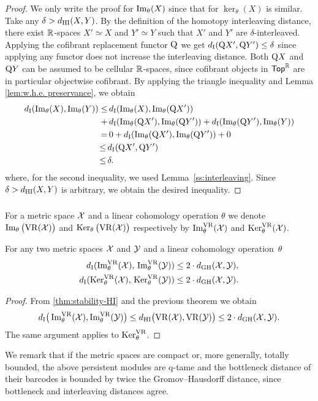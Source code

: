 \begin{proof}
	We only write the proof for $\operatorname{Im}_\theta(X)$ since that for $\ker_\theta(X)$ is similar.
	Take any $\delta > d_{\mathrm{HI}}(X,Y)$.
	By the definition of the homotopy interleaving distance, there exist $\mathbb{R}$-spaces $X' \simeq X$ and $Y' \simeq Y$ such that $X'$ and $Y'$ are $\delta$-interleaved.
	Applying the cofibrant replacement functor $\mathrm{Q}$ we get $d_{\mathrm{I}}(\mathrm{Q} X', \mathrm{Q} Y') \leq \delta$ since applying any functor does not increase the interleaving distance.
	Both $\mathrm{Q} X$ and $\mathrm{Q} Y$ can be assumed to be cellular $\mathbb{R}$-spaces, since cofibrant objects in $\mathsf{Top}^{\mathbb{R}}$ are in particular objectwise cofibrant.
	By applying the triangle inequality and Lemma \ref{lem:w.h.e. preservance}, we obtain
	\begin{align*}
		d_{\mathrm{I}}(\operatorname{Im}_\theta(X), \operatorname{Im}_\theta(Y)) \leq& \,
		d_{\mathrm{I}}(\operatorname{Im}_\theta(X), \operatorname{Im}_\theta(\mathrm{Q} X')) \\ +& \,
		d_{\mathrm{I}}(\operatorname{Im}_\theta(\mathrm{Q} X'), \operatorname{Im}_\theta(\mathrm{Q} Y')) + d_{\mathrm{I}}(\operatorname{Im}_\theta(\mathrm{Q} Y'), \operatorname{Im}_\theta(Y)) \\ =& \,
		0 + d_{\mathrm{I}}(\operatorname{Im}_\theta(\mathrm{Q} X'), \operatorname{Im}_\theta(\mathrm{Q} Y')) + 0 \\ \leq \,&
		d_{\mathrm{I}}(\mathrm{Q} X', \mathrm{Q} Y') \\ \leq \,&
		\delta.
	\end{align*}
	where, for the second inequality, we used Lemma~\ref{ss:interleaving}.
	Since $\delta > d_{\mathrm{HI}}(X,Y)$ is arbitrary, we obtain the desired inequality.
\end{proof}

\subsubsection{}\label{cor:theta stability VR}

For a metric space \(\mathcal{X}\) and a linear cohomology operation \(\theta\) we denote \(\operatorname{Im}_\theta\big(\mathrm{VR}(\mathcal{X})\big)\) and \(\operatorname{Ker}_\theta\big(\mathrm{VR}(\mathcal{X})\big)\) respectively by \(\operatorname{Im}_\theta^{\mathrm{VR}}(\mathcal{X})\) and \(\operatorname{Ker}_\theta^{\mathrm{VR}}(\mathcal{X})\).

\theorem
For any two metric spaces $\mathcal{X}$ and $\mathcal{Y}$ and a linear cohomology operation~$\theta$
\begin{align*}
	d_{\mathrm{I}}(\operatorname{Im}_\theta^{\mathrm{VR}}(\mathcal{X}),\, \operatorname{Im}_\theta^{\mathrm{VR}}(\mathcal{Y})) \leq 2 \cdot d_{\mathrm{GH}}(\mathcal{X},\mathcal{Y}), \\
	d_{\mathrm{I}}(\operatorname{Ker}_\theta^{\mathrm{VR}}(\mathcal{X}),\, \operatorname{Ker}_\theta^{\mathrm{VR}}(\mathcal{Y})) \leq 2 \cdot d_{\mathrm{GH}}(\mathcal{X},\mathcal{Y}).
\end{align*}

\begin{proof}
	From \cref{thm:stability-HI} and the previous theorem we obtain
	\[
	d_{\mathrm{I}}\big(\operatorname{Im}_\theta^{\mathrm{VR}}(\mathcal{X}), \operatorname{Im}_\theta^{\mathrm{VR}}(\mathcal{Y})\big) \leq
	d_{\mathrm{HI}}\big(\mathrm{VR}(\mathcal{X}), \mathrm{VR}(\mathcal{Y})\big) \leq 2 \cdot d_{\mathrm{GH}}(\mathcal{X},\mathcal{Y}).
	\]
	The same argument applies to $\operatorname{Ker}_\theta^{\mathrm{VR}}$.
\end{proof}

We remark that if the metric spaces are compact or, more generally, totally bounded, the above persistent modules are q-tame and the bottleneck distance of their barcodes is bounded by twice the Gromov--Hausdorff distance, since bottleneck and interleaving distances agree.